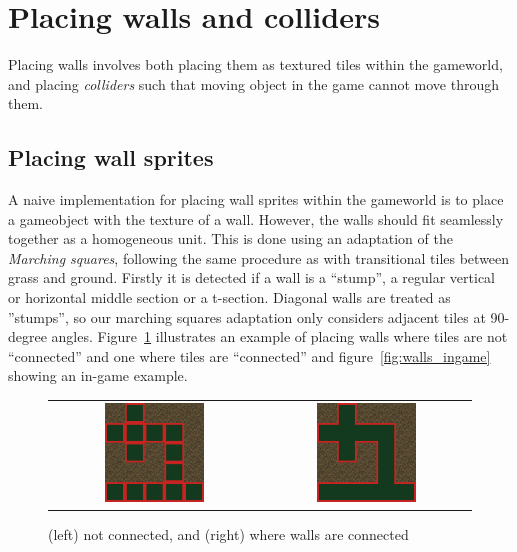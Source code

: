 \section{Placing walls and colliders}
Placing walls involves both placing them as textured tiles within the gameworld, and placing \textit{colliders} such that moving object in the game cannot move through them.

\subsection{Placing wall sprites}
A naive implementation for placing wall sprites within the gameworld is to place a gameobject with the texture of a wall. 
However, the walls should fit seamlessly together as a homogeneous unit. 
This is done using an adaptation of the \textit{Marching squares}, following the same procedure as with transitional tiles between grass and ground.
Firstly it is detected if a wall is a ``stump'', a regular vertical or horizontal middle section or a t-section. 
Diagonal walls are treated as ''stumps'', so our marching squares adaptation only considers adjacent tiles at 90-degree angles.
Figure~\ref{fig:wall_comparison} illustrates an example of placing walls where tiles are not ``connected'' and one where tiles are ``connected'' and figure~\ref{fig:walls_ingame} showing an in-game example.

\begin{figure}[H]
    \centering
    \begin{tabular}{cc}
        \includegraphics[width=0.5\textwidth]{figures/generating_levels/wall_no_border.png}
        &
        \includegraphics[width=0.5\textwidth]{figures/generating_levels/wall_with_border.png}
    \end{tabular}
    \caption{(left) not connected, and (right) where walls are connected}\label{fig:wall_comparison}
\end{figure}

